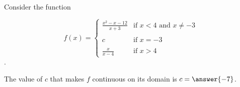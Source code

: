 \documentclass{ximera}
\author{Nela Lakos \and Kyle Parsons}
\begin{document}
\begin{exercise}

Consider the function

\[
f(x) = 
\begin{cases}
\frac{x^2-x-12}{x+3} & \text{if }x<4\text{ and }x\neq-3\\ \\
c & \text{if }x=-3\\ \\
\frac{x}{x-4} & \text{if }x>4
\end{cases}
\].

The value of $c$ that makes $f$ continuous on its domain is $c=\answer{-7}$.

\end{exercise}
\end{document}
